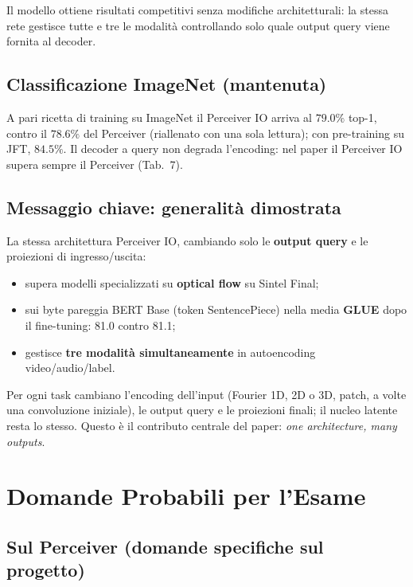 \documentclass[
  11pt,
]{article}
\begin{document}
Il modello ottiene risultati competitivi senza modifiche architetturali: la stessa rete gestisce tutte e tre le modalità controllando solo quale output query viene fornita al decoder.

\subsection{Classificazione ImageNet (mantenuta)}

A pari ricetta di training su ImageNet il Perceiver IO arriva al $79.0\%$ top-1, contro il $78.6\%$ del Perceiver (riallenato con una sola lettura); con pre-training su JFT, $84.5\%$. Il decoder a query non degrada l'encoding: nel paper il Perceiver IO supera sempre il Perceiver (Tab.~7).

\subsection{Messaggio chiave: generalità dimostrata}

\begin{notabox}[title={\textbf{Generalità dimostrata dai numeri}}]
La stessa architettura Perceiver IO, cambiando solo le \textbf{output query} e le proiezioni di ingresso/uscita:
\begin{itemize}
  \item supera modelli specializzati su \textbf{optical flow} su Sintel Final;
  \item sui byte pareggia BERT Base (token SentencePiece) nella media \textbf{GLUE} dopo il fine-tuning: 81.0 contro 81.1;
  \item gestisce \textbf{tre modalità simultaneamente} in autoencoding video/audio/label.
\end{itemize}
Per ogni task cambiano l'encoding dell'input (Fourier 1D, 2D o 3D, patch, a volte una convoluzione iniziale), le output query e le proiezioni finali; il nucleo latente resta lo stesso. Questo è il contributo centrale del paper: \emph{one architecture, many outputs}.
\end{notabox}

\section{Domande Probabili per l'Esame}

\subsection{Sul Perceiver (domande specifiche sul progetto)}
\end{document}
